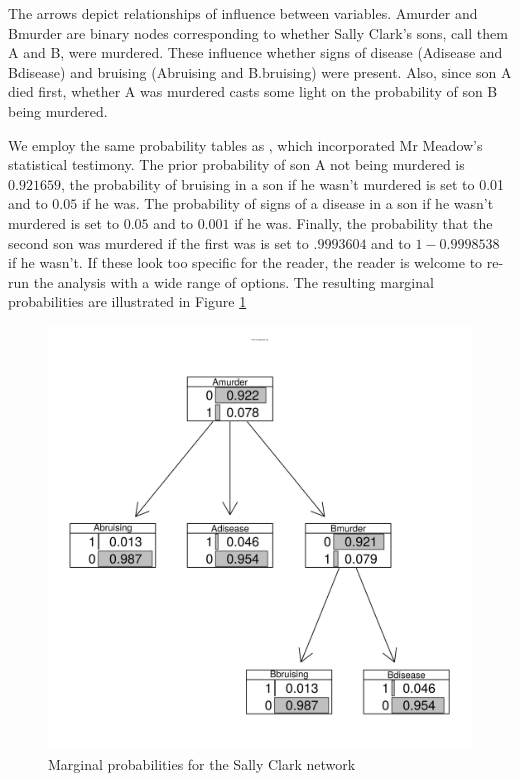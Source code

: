 \documentclass[10pt,]{scrartcl}
\begin{document}
The  arrows  depict  relationships  of  influence  between  variables. \textsf{Amurder} and \textsf{Bmurder} are binary nodes corresponding to whether Sally  Clark’s  sons,   call  them A and B, were murdered. These  influence  whether  signs of disease (\textsf{Adisease} and \textsf{Bdisease}) and bruising (\textsf{Abruising} and \textsf{B.bruising}) were present. Also, since  son A died first, whether A was murdered casts some light on the probability of son B being murdered.

We employ the same probability tables as \citet{Fenton2018Risk}, which incorporated Mr Meadow's statistical testimony. The prior probability of son A not being murdered is $0.921659$, the probability of bruising in a son if he wasn't murdered is set to 0.01 and to $0.05$ if he was. The probability of signs of a disease in a son if he wasn't murdered is set to $0.05$ and to $0.001$ if he was. Finally, the probability that the second son was murdered if the first was is set to $.9993604$ and to $1-0.9998538$ if he wasn't. If these look too specific for the reader, the reader is welcome to re-run the analysis with a wide range of options. The resulting marginal probabilities are illustrated in Figure \ref{fig:SCBN}

\begin{figure}[H]
    \centering
    \includegraphics{SCBN.png}
    \caption{Marginal probabilities for the Sally Clark network}
    \label{fig:SCBN}
\end{figure}
\end{document}

